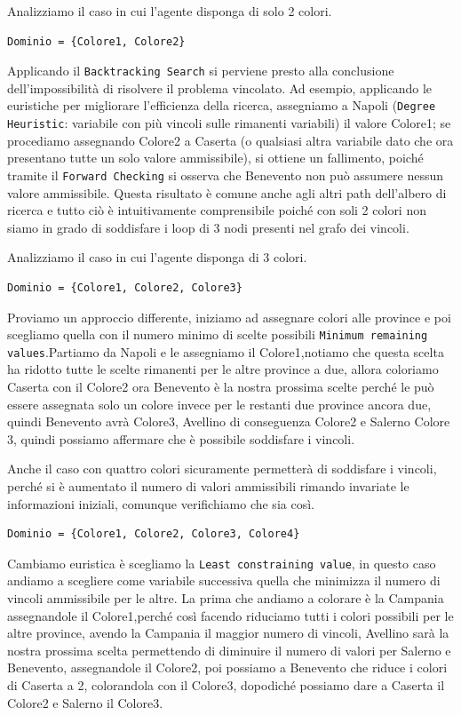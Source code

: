 		Analizziamo il caso in cui l'agente disponga di solo 2 colori.
		\begin{lstlisting}
Dominio = {Colore1, Colore2}
		\end{lstlisting}
		Applicando il \texttt{Backtracking Search} si perviene presto alla conclusione dell'impossibilità di risolvere il problema vincolato. Ad esempio, applicando le euristiche per migliorare l'efficienza della ricerca, assegniamo a Napoli (\texttt{Degree Heuristic}: variabile con più vincoli sulle rimanenti variabili) il valore Colore1; se procediamo assegnando Colore2 a Caserta (o qualsiasi altra variabile dato che ora presentano tutte un solo valore ammissibile), si ottiene un fallimento, poiché tramite il \texttt{Forward Checking} si osserva che Benevento non può assumere nessun valore ammissibile. Questa risultato è comune anche agli altri path dell'albero di ricerca e tutto ciò è intuitivamente comprensibile poiché con soli 2 colori non siamo in grado di soddisfare i loop di 3 nodi presenti nel grafo dei vincoli.\par
		Analizziamo il caso in cui l'agente disponga di 3 colori.
		\begin{lstlisting}
Dominio = {Colore1, Colore2, Colore3}
		\end{lstlisting}
		Proviamo un approccio differente, iniziamo ad assegnare colori alle province e poi scegliamo quella con il numero minimo di scelte possibili \texttt{Minimum remaining values}.Partiamo da Napoli e le assegniamo il Colore1,notiamo che questa scelta ha ridotto tutte le scelte rimanenti per le altre province a due, allora coloriamo Caserta con il Colore2 ora Benevento è la nostra prossima scelte perché le può essere assegnata solo un colore invece per le restanti due province ancora due, quindi Benevento avrà Colore3, Avellino di conseguenza Colore2 e Salerno Colore 3, quindi possiamo affermare che è possibile soddisfare i vincoli.\par
		Anche il caso con quattro colori sicuramente permetterà di soddisfare i vincoli, perché si è aumentato il numero di valori ammissibili rimando invariate le informazioni iniziali, comunque verifichiamo che sia così.
		\begin{lstlisting}
Dominio = {Colore1, Colore2, Colore3, Colore4}
		\end{lstlisting}
		Cambiamo euristica è scegliamo la \texttt{Least constraining value}, in questo caso andiamo a scegliere come variabile successiva quella che minimizza il numero di vincoli ammissibile per le altre. La prima che andiamo a colorare è la Campania assegnandole il Colore1,perché così facendo riduciamo tutti i colori possibili per le altre province, avendo la Campania il maggior numero di vincoli, Avellino sarà la nostra prossima scelta permettendo di diminuire il numero di valori per Salerno e Benevento, assegnandole il Colore2, poi possiamo a Benevento che riduce i colori di Caserta a 2, colorandola con il Colore3, dopodiché possiamo dare a Caserta il Colore2 e Salerno il Colore3.\par
